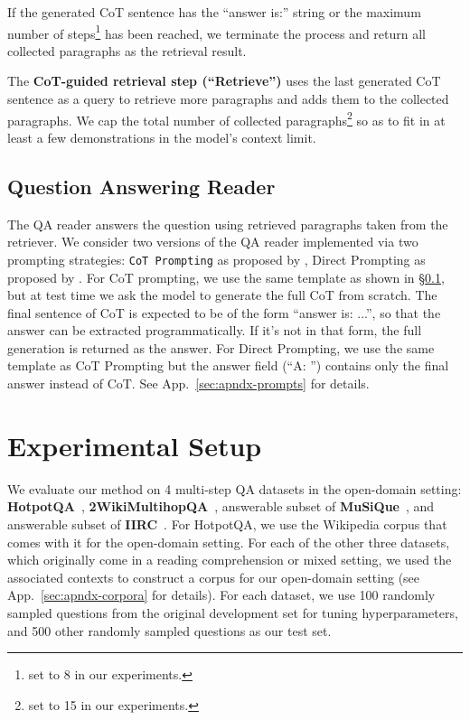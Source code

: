 If the generated CoT sentence has the ``answer is:'' string or the maximum number of steps\footnote{set to 8 in our experiments.} has been reached, we terminate the process and return all collected paragraphs as the retrieval result.

The \textbf{CoT-guided retrieval step (``Retrieve'')} uses the last generated CoT sentence as a query to retrieve more paragraphs and adds them to the collected paragraphs. We cap the total number of collected paragraphs\footnote{set to 15 in our experiments.} so as to fit in at least a few demonstrations in the model's context limit.

\subsection{Question Answering Reader}
\label{subsec:reader}

The QA reader answers the question using retrieved paragraphs taken from the retriever. We consider two versions of the QA reader implemented via two prompting strategies: \texttt{CoT Prompting} as proposed by \citet{cot}, Direct Prompting as proposed by \citet{originalgpt3}. For CoT prompting, we use the same template as shown in \S\ref{subsec:reader}, but at test time we ask the model to generate the full CoT from scratch. The final sentence of CoT is expected to be of the form ``answer is: ...'', so that the answer can be extracted programmatically. If it's not in that form, the full generation is returned as the answer. For Direct Prompting, we use the same template as CoT Prompting but the answer field (``A: '') contains only the final answer instead of CoT. See App.~\ref{sec:apndx-prompts} for details.

\section{Experimental Setup}
\label{sec:exp-setup}

We evaluate our method on 4 multi-step QA datasets in the open-domain setting: \textbf{HotpotQA}~\cite{hotpotqa}, \textbf{2WikiMultihopQA}~\cite{xanh2020_2wikimultihop}, answerable subset of \textbf{MuSiQue}~\cite{musique}, and answerable subset of \textbf{IIRC}~\cite{iirc}. For HotpotQA, we use the Wikipedia corpus that comes with it for the open-domain setting. For each of the other three datasets, which originally come in a reading comprehension or mixed setting, we used the associated contexts to construct a corpus for our open-domain setting (see App.~\ref{sec:apndx-corpora} for details). For each dataset, we use 100 randomly sampled questions from the original development set for tuning hyperparameters, and 500 other randomly sampled questions as our test set.

